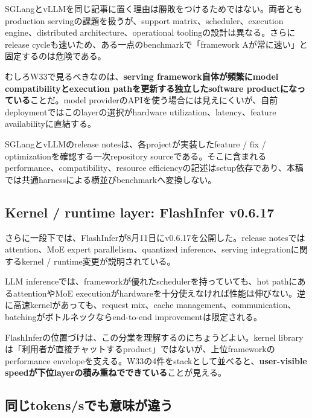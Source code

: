 SGLangとvLLMを同じ記事に置く理由は勝敗をつけるためではない。両者ともproduction servingの課題を扱うが、support matrix、scheduler、execution engine、distributed architecture、operational toolingの設計は異なる。さらにrelease cycleも速いため、ある一点のbenchmarkで「framework Aが常に速い」と固定するのは危険である。

むしろW33で見るべきなのは、\textbf{serving framework自体が頻繁にmodel compatibilityとexecution pathを更新する独立したsoftware productになっている}ことだ。model providerのAPIを使う場合には見えにくいが、自前deploymentではこのlayerの選択がhardware utilization、latency、feature availabilityに直結する。

\begin{claimboundary}
SGLangとvLLMのrelease notesは、各projectが実装したfeature / fix / optimizationを確認する一次repository sourceである\cite{sglang-0517-w33,vllm-0270,vllm-0271}。そこに含まれるperformance、compatibility、resource efficiencyの記述はsetup依存であり、本稿では共通harnessによる横並びbenchmarkへ変換しない。
\end{claimboundary}

\subsection*{Kernel / runtime layer: FlashInfer v0.6.17}

さらに一段下では、FlashInferが8月11日にv0.6.17を公開した\cite{flashinfer-0617}。release notesではattention、MoE expert parallelism、quantized inference、serving integrationに関するkernel / runtime変更が説明されている。

LLM inferenceでは、frameworkが優れたschedulerを持っていても、hot pathにあるattentionやMoE executionがhardwareを十分使えなければ性能は伸びない。逆に高速kernelがあっても、request mix、cache management、communication、batchingがボトルネックならend-to-end improvementは限定される。

FlashInferの位置づけは、この分業を理解するのにちょうどよい。kernel libraryは「利用者が直接チャットするproduct」ではないが、上位frameworkのperformance envelopeを支える。W33の4件をstackとして並べると、\textbf{user-visible speedが下位layerの積み重ねでできている}ことが見える。

\subsection*{同じtokens/sでも意味が違う}

